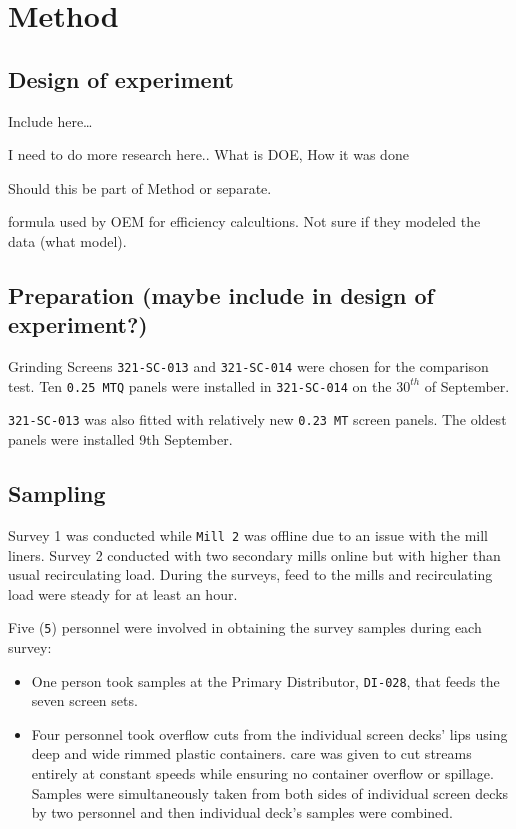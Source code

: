 \documentclass[
]{article}
\begin{document}
\hypertarget{method}{%
\section{Method}\label{method}}

\hypertarget{design-of-experiment}{%
\subsection{Design of experiment}\label{design-of-experiment}}

Include here\ldots{}

I need to do more research here.. What is DOE, How it was done

Should this be part of Method or separate.

formula used by OEM for efficiency calcultions. Not sure if they modeled
the data (what model).

\hypertarget{preparation-maybe-include-in-design-of-experiment}{%
\subsection{Preparation (maybe include in design of
experiment?)}\label{preparation-maybe-include-in-design-of-experiment}}

Grinding Screens \texttt{321-SC-013} and \texttt{321-SC-014} were chosen
for the comparison test. Ten \texttt{0.25\ MTQ} panels were installed in
\texttt{321-SC-014} on the \(30^{th}\) of September.

\texttt{321-SC-013} was also fitted with relatively new
\texttt{0.23\ MT} screen panels. The oldest panels were installed 9th
September.

\hypertarget{sampling}{%
\subsection{Sampling}\label{sampling}}

Survey 1 was conducted while \texttt{Mill\ 2} was offline due to an
issue with the mill liners. Survey 2 conducted with two secondary mills
online but with higher than usual recirculating load. During the
surveys, feed to the mills and recirculating load were steady for at
least an hour.

Five (\texttt{5}) personnel were involved in obtaining the survey
samples during each survey:

\begin{itemize}
\item
  One person took samples at the Primary Distributor, \texttt{DI-028},
  that feeds the seven screen sets.
\item
  Four personnel took overflow cuts from the individual screen decks'
  lips using deep and wide rimmed plastic containers. care was given to
  cut streams entirely at constant speeds while ensuring no container
  overflow or spillage. Samples were simultaneously taken from both
  sides of individual screen decks by two personnel and then individual
  deck's samples were combined.
\end{itemize}
\end{document}
